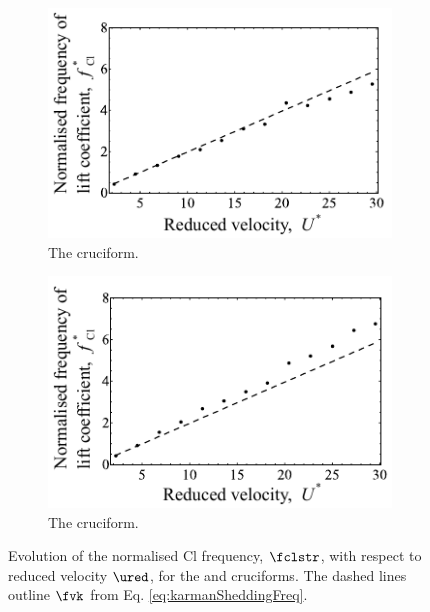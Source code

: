 \documentclass[a4paper,fleqn]{cas-sc}
\begin{document}
\begin{figure}
  \centering
  \begin{subfigure}[h]{0.4\textwidth}
    \includegraphics[width=\textwidth]{figs/clFreq4}
    \caption{The \angfo{} cruciform.}
    \label{fig:clFreq4}
  \end{subfigure}
  \hspace{6mm}
  \begin{subfigure}[h]{0.4\textwidth}
    \includegraphics[width=\textwidth]{figs/clFreq3}
    \caption{The \angth{} cruciform.}
    \label{fig:clFreq3}
  \end{subfigure}

  \label{fig:clFreq43}
  \caption{Evolution of the normalised Cl frequency, $\fclstr$, with respect to reduced velocity $\ured$, for the \angfo{} and \angth{} cruciforms. The dashed lines outline $\fvk$ from Eq. \ref{eq:karmanSheddingFreq}.}
\end{figure}
\end{document}
